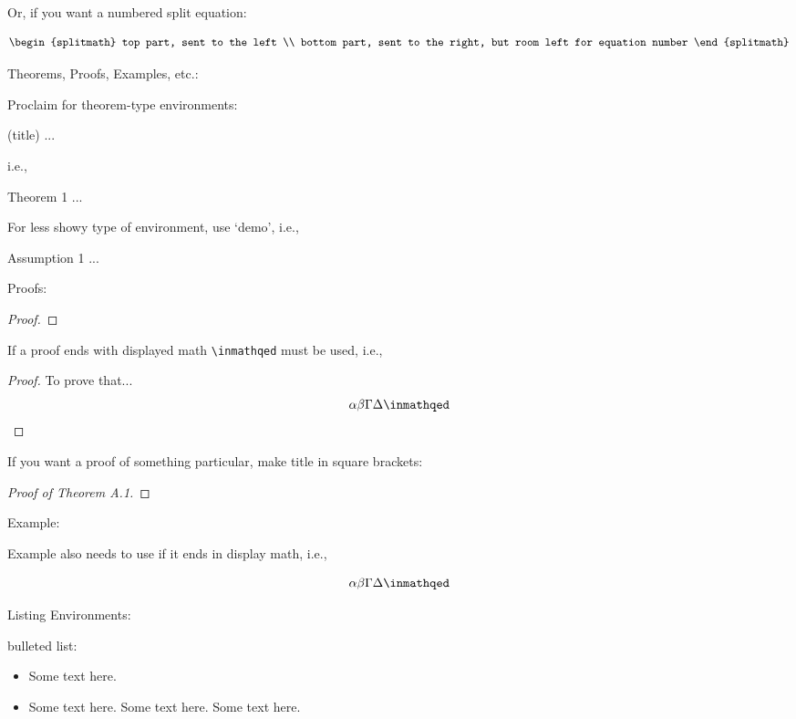 Or, if you want a numbered split equation:

\begin{equation}
\begin{splitmath}
top part, sent to the left
\\
bottom part, sent to the right, but room left for equation number
\end{splitmath}
\end{equation}

Theorems, Proofs, Examples, etc.:

Proclaim for theorem-type environments:
\begin{proclaim}{(title)}
...
\end{proclaim}

i.e.,
\begin{proclaim}{Theorem 1}
...
\end{proclaim}

For less showy type of environment, use `demo', i.e.,
\begin{demo}{Assumption 1}
...
\end{demo}

Proofs:
\begin{proof}
\end{proof}


If a proof ends with displayed math \verb+\inmathqed+
must be used, i.e.,

\begin{proof}
To prove that...
\[
\alpha\beta\Gamma\Delta\inmathqed
\]
\end{proof}

If you want a proof of something particular, make title in square brackets:
\begin{proof}[Proof of Theorem A.1]
\end{proof}

Example:
\begin{example}
\end{example}

Example also needs to use \inmathqed if it ends in display math, i.e., 

\begin{example}
\[
\alpha\beta\Gamma\Delta\inmathqed
\]
\end{example}


Listing Environments:

bulleted list:
\begin{itemize}
\item Some text here. 

\item Some text here. Some text here. Some text here.  
\end{itemize}


